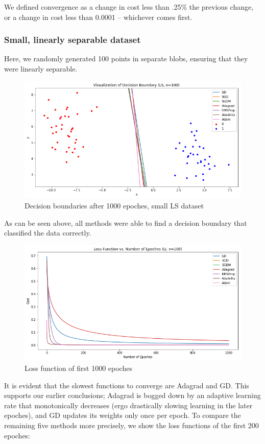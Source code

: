 \documentclass[twoside,11pt]{homework}
\begin{document}
We defined convergence as a change in cost less than .25\% the previous change, or a change in cost less than 0.0001 -- whichever comes first.

\subsubsection*{Small, linearly separable dataset}
Here, we randomly generated 100 points in separate blobs, ensuring that they were linearly separable. 
\begin{figure}[H]
		\centering
		\includegraphics[scale=.5]{q5/sep_100/lines.png}	
		\caption{Decision boundaries after 1000 epoches, small LS dataset}
	\end{figure}
	
As can be seen above, all methods were able to find a decision boundary that classified the data correctly.

	\begin{figure}[H]
		\centering
		\includegraphics[scale=.5]{q5/sep_100/loss_n1000.png}	
		\caption{Loss function of first 1000 epoches}
	\end{figure}
	
It is evident that the slowest functions to converge are Adagrad and GD. This supports our earlier conclusions; Adagrad is bogged down by an adaptive learning rate that monotonically decreases (ergo drastically slowing learning in the later epoches), and GD updates its weights only once per epoch. To compare the remaining five methods more precisely, we show the loss functions of the first 200 epoches:
\end{document}

